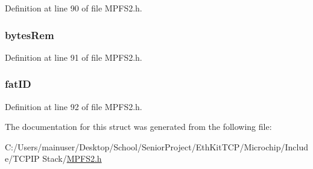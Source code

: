 Definition at line 90 of file M\+P\+F\+S2.\+h.

\hypertarget{struct_m_p_f_s___s_t_u_b_a238767e23c285d139b24816de23910ba}{}
\subsubsection[{bytes\+Rem}]{ bytes\+Rem}\label{struct_m_p_f_s___s_t_u_b_a238767e23c285d139b24816de23910ba}


Definition at line 91 of file M\+P\+F\+S2.\+h.

\hypertarget{struct_m_p_f_s___s_t_u_b_a80d2cce88ce89c9be913461577878a94}{}
\subsubsection[{fat\+I\+D}]{ fat\+I\+D}\label{struct_m_p_f_s___s_t_u_b_a80d2cce88ce89c9be913461577878a94}


Definition at line 92 of file M\+P\+F\+S2.\+h.



The documentation for this struct was generated from the following file\+:\begin{DoxyCompactItemize}
\item 
C\+:/\+Users/mainuser/\+Desktop/\+School/\+Senior\+Project/\+Eth\+Kit\+T\+C\+P/\+Microchip/\+Include/\+T\+C\+P\+I\+P Stack/\hyperlink{_m_p_f_s2_8h}{M\+P\+F\+S2.\+h}\end{DoxyCompactItemize}
